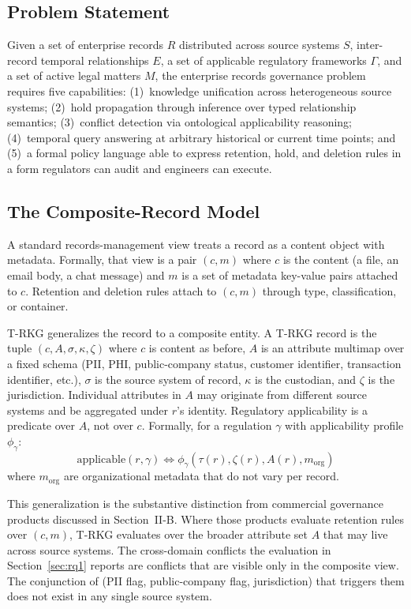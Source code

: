 \documentclass{ieeeaccess}
\begin{document}
\subsection{Problem Statement}

Given a set of enterprise records $R$ distributed across source systems $S$, inter-record temporal relationships $E$, a set of applicable regulatory frameworks $\Gamma$, and a set of active legal matters $M$, the enterprise records governance problem requires five capabilities: (1)~knowledge unification across heterogeneous source systems; (2)~hold propagation through inference over typed relationship semantics; (3)~conflict detection via ontological applicability reasoning; (4)~temporal query answering at arbitrary historical or current time points; and (5)~a formal policy language able to express retention, hold, and deletion rules in a form regulators can audit and engineers can execute.

\subsection{The Composite-Record Model}
\label{sec:composite}

A standard records-management view treats a record as a content object with metadata. Formally, that view is a pair $(c, m)$ where $c$ is the content (a file, an email body, a chat message) and $m$ is a set of metadata key-value pairs attached to $c$. Retention and deletion rules attach to $(c, m)$ through type, classification, or container.

T-RKG generalizes the record to a composite entity. A T-RKG record is the tuple $(c, A, \sigma, \kappa, \zeta)$ where $c$ is content as before, $A$ is an attribute multimap over a fixed schema (PII, PHI, public-company status, customer identifier, transaction identifier, etc.), $\sigma$ is the source system of record, $\kappa$ is the custodian, and $\zeta$ is the jurisdiction. Individual attributes in $A$ may originate from different source systems and be aggregated under $r$'s identity. Regulatory applicability is a predicate over $A$, not over $c$. Formally, for a regulation $\gamma$ with applicability profile $\phi_\gamma$:
\begin{equation}
    \mathrm{applicable}(r, \gamma) \iff \phi_\gamma(\tau(r), \zeta(r), A(r), m_{\mathrm{org}})
\end{equation}
where $m_{\mathrm{org}}$ are organizational metadata that do not vary per record.

This generalization is the substantive distinction from commercial governance products discussed in Section~II-B. Where those products evaluate retention rules over $(c, m)$, T-RKG evaluates over the broader attribute set $A$ that may live across source systems. The cross-domain conflicts the evaluation in Section~\ref{sec:rq1} reports are conflicts that are visible only in the composite view. The conjunction of (PII flag, public-company flag, jurisdiction) that triggers them does not exist in any single source system.
\end{document}
